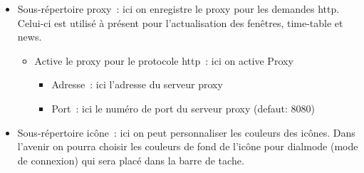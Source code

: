 \begin{itemize}
  \item Sous-répertoire proxy~: ici on enregistre le proxy pour les demandes http.
    Celui-ci est utilisé à présent pour l'actualisation des fenêtres, time-table
    et news.
    \begin{itemize}
    \item Active le proxy pour le protocole http~: ici on active Proxy
          \begin{itemize}
            \item Adresse~: ici l'adresse du serveur proxy
            \item Port~: ici le numéro de port du serveur proxy (defaut: 8080)
          \end{itemize}
    \end{itemize}

  \item Sous-répertoire icône~: ici on peut personnaliser les couleurs des icônes.
    Dans l'avenir on pourra choisir les couleurs de fond de l'icône pour dialmode
    (mode de connexion) qui sera placé dans la barre de tache.


\end{itemize}
